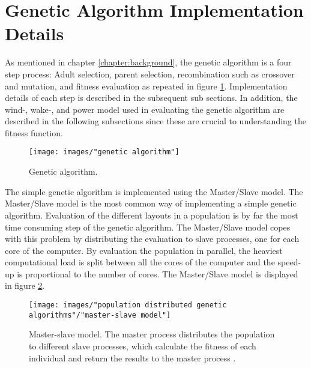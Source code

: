 \section{Genetic Algorithm Implementation Details}\label{section:genetic algorithm}
As mentioned in chapter \ref{chapter:background}, the genetic algorithm is a four step process: Adult selection, parent selection, recombination such as crossover and mutation, and fitness evaluation as repeated in figure \ref{figure:genetic algorithm steps}. Implementation details of each step is described in the subsequent sub sections. In addition, the wind-, wake-, and power model used in evaluating the genetic algorithm are described in the following subsections since these are crucial to understanding the fitness function. 


\begin{figure}[h!]
\begin{center}
\texttt{[image: images/"genetic algorithm"]}
\caption{Genetic algorithm.}
\label{figure:genetic algorithm steps}
\end{center}
\end{figure}


\noindent The simple genetic algorithm is implemented using the Master/Slave model. The Master/Slave model is the most common way of implementing a simple genetic algorithm. Evaluation of the different layouts in a population is by far the most time consuming step of the genetic algorithm. The Master/Slave model copes with this problem by distributing the evaluation to slave processes, one for each core of the computer. By evaluation the population in parallel, the heaviest computational load is split between all the cores of the computer and the speed-up is proportional to the number of cores. The Master/Slave model is displayed in figure \ref{Master-Slave Model}.\\


\begin{figure}[h!]
\begin{center}
\texttt{[image: images/"population distributed genetic algorithms"/"master-slave model"]}
\caption{Master-slave model. The master process distributes the population to different slave processes, which calculate the fitness of each individual and return the results to the master process \citep{Gong}.}
\label{Master-Slave Model}
\end{center}
\end{figure}


